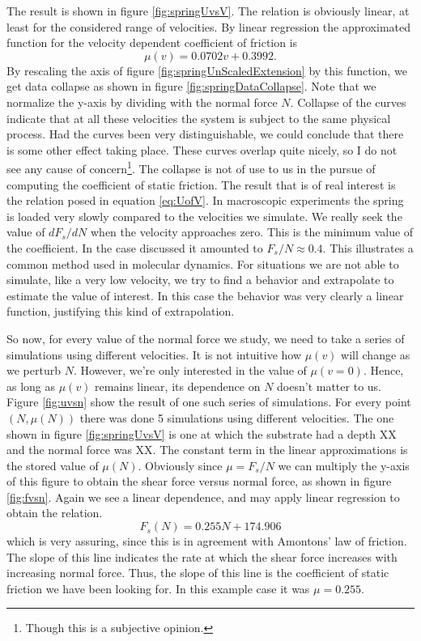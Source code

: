 \documentclass[twoside,english]{uiofysmaster}
\begin{document}
The result is shown in figure \ref{fig:springUvsV}. 
The relation is obviously linear, at least for the considered range of velocities. 
By linear regression the approximated function for the velocity dependent coefficient of friction is 
\begin{equation}\label{eq:UofV}
	\mu(v) = 0.0702v + 0.3992.
\end{equation}
By rescaling the axis of figure \ref{fig:springUnScaledExtension} 
by this function, we get data collapse as shown in figure \ref{fig:springDataCollapse}. 
Note that we normalize the y-axis by dividing with the normal force $N$.
Collapse of the curves indicate that at all these velocities the system is subject to the same physical process. 
Had the curves been very distinguishable, we could conclude that there is some other effect taking place. 
These curves overlap quite nicely, so I do not see any cause of concern\footnote{Though this is a subjective opinion.}.
The collapse is not of use to us in the pursue of computing the coefficient of static friction. 
The result that is of real interest is the relation posed in equation \eqref{eq:UofV}. 
In macroscopic experiments the spring is loaded very slowly compared to the velocities we simulate. 
We really seek the value of $dF_s/dN$ when the velocity approaches zero.
This is the minimum value of the coefficient. 
In the case discussed it amounted to $F_s/N \approx 0.4$.
This illustrates a common method used in molecular dynamics. 
For situations we are not able to simulate, like a very low velocity, we try to find a behavior and extrapolate to estimate the value of interest. 
In this case the behavior was very clearly a linear function, justifying this kind of extrapolation. 


So now, for every value of the normal force we study, we need to take a series of simulations using different velocities.
It is not intuitive how $\mu(v)$ will change as we perturb $N$. 
However, we're only interested in the value of $\mu(v=0)$. 
Hence, as long as $\mu(v)$ remains linear, its dependence on $N$ doesn't matter to us. %
Figure \ref{fig:uvsn} show the result of one such series of simulations. 
For every point $(N,\mu(N))$ there was done 5 simulations using different velocities. 
The one shown in figure \ref{fig:springUvsV} is one at which the substrate had a depth XX and the normal force was XX.
The constant term in the linear approximations is the stored value of $\mu(N)$.
Obviously since $\mu = F_s/N$ we can multiply the y-axis of this figure to obtain the shear force versus normal force, as shown in figure \ref{fig:fvsn}.
Again we see a linear dependence, and may apply linear regression to obtain the relation.
\begin{equation}
	F_s(N) = 0.255N + 174.906
\end{equation}
which is very assuring, since this is in agreement with Amontons' law of friction. 
The slope of this line indicates the rate at which the shear force increases with increasing normal force. 
Thus, the slope of this line is the coefficient of static friction we have been looking for.
In this example case it was $\mu = 0.255$.
\end{document}
